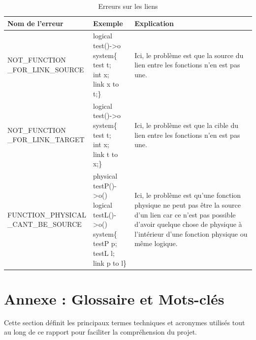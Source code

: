 \documentclass[a4paper, 11pt]{article}
\begin{document}
\begin{appendix}
\begin{table}[htbp]
    \centering
    \begin{tabular}{|l|l|p{5cm}|}
        \hline
        Nom de l'erreur & Exemple & Explication \\
        \hline
        \makecell{NOT\_FUNCTION\\\_FOR\_LINK\_SOURCE} & \makecell{logical test()->o\\
        system\{\\test t;\\int x;\\ link x to t;\}} & Ici, le problème est que la source du lien entre les fonctions n'en est pas une.\\ 
        \hline
        \makecell{NOT\_FUNCTION\\\_FOR\_LINK\_TARGET} & \makecell{logical test()->o\\
        system\{\\test t;\\int x;\\ link t to x;\}} & Ici, le problème est que la cible du lien entre les fonctions n'en est pas une. \\
        \hline
        \makecell{FUNCTION\_PHYSICAL\\\_CANT\_BE\_SOURCE} & \makecell{physical testP()->o()\\logical testL()->o()\\system\{\\testP p;\\testL l;\\link p to l\}} & Ici, le problème est qu'une fonction physique ne peut pas être la source d'un lien car ce n'est pas possible d'avoir quelque chose de physique à l'intérieur d'une fonction physique ou même logique.\\
        \hline
    \end{tabular}
    \caption{Erreurs sur les liens}
    \label{tab:erreur_lien}
\end{table}

\end{appendix}

\newpage
\newpage
\section{Annexe : Glossaire et Mots-clés}
\label{sec:glossaire}

Cette section définit les principaux termes techniques et acronymes utilisés tout au long de ce rapport pour faciliter la compréhension du projet.
\end{document}
